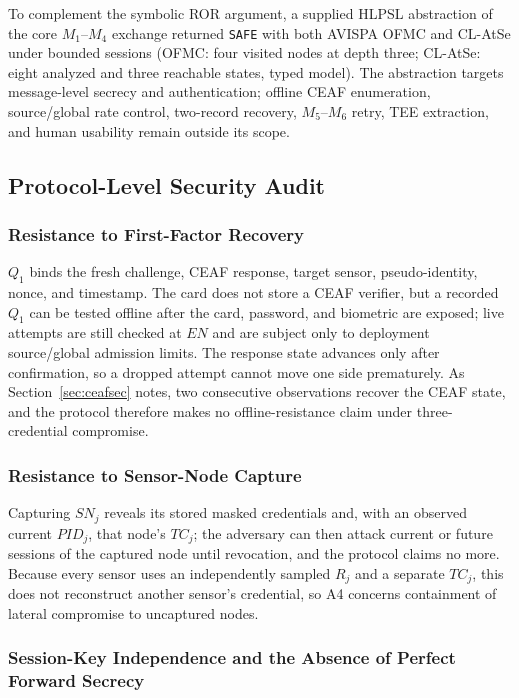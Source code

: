 \documentclass[cmc,article,submit,moreauthors,pdftex]{Definitions/tsp}
\begin{document}
To complement the symbolic ROR argument, a supplied HLPSL abstraction of the core $M_1$--$M_4$ exchange returned \texttt{SAFE} with both AVISPA OFMC and CL-AtSe under bounded sessions (OFMC: four visited nodes at depth three; CL-AtSe: eight analyzed and three reachable states, typed model). The abstraction targets message-level secrecy and authentication; offline CEAF enumeration, source/global rate control, two-record recovery, $M_5$--$M_6$ retry, TEE extraction, and human usability remain outside its scope.

\subsection{Protocol-Level Security Audit}\label{sec:informal}

\subsubsection{Resistance to First-Factor Recovery}

$Q_1$ binds the fresh challenge, CEAF response, target sensor, pseudo-identity, nonce, and timestamp. The card does not store a CEAF verifier, but a recorded $Q_1$ can be tested offline after the card, password, and biometric are exposed; live attempts are still checked at $EN$ and are subject only to deployment source/global admission limits. The response state advances only after confirmation, so a dropped attempt cannot move one side prematurely. As Section~\ref{sec:ceafsec} notes, two consecutive observations recover the CEAF state, and the protocol therefore makes no offline-resistance claim under three-credential compromise.

\subsubsection{Resistance to Sensor-Node Capture}

Capturing $SN_j$ reveals its stored masked credentials and, with an observed current $PID_j$, that node's $TC_j$; the adversary can then attack current or future sessions of the captured node until revocation, and the protocol claims no more. Because every sensor uses an independently sampled $R_j$ and a separate $TC_j$, this does not reconstruct another sensor's credential, so A4 concerns containment of lateral compromise to uncaptured nodes.

\subsubsection{Session-Key Independence and the Absence of Perfect Forward Secrecy}
\end{document}
